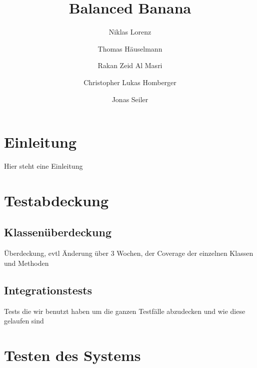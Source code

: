 \documentclass[a4paper,12pt]{article}
\title{Balanced Banana}
\author{Niklas Lorenz \and Thomas Häuselmann \and Rakan Zeid Al Masri \and Christopher Lukas Homberger \and Jonas Seiler}
\begin{document}
\setcounter{page}{2}
\tableofcontents          %
\clearpage
{}

\section{Einleitung}
\vspace{0.2cm}
Hier steht eine Einleitung
\section{Testabdeckung}
\subsection{Klassenüberdeckung}
\vspace{0.2cm}
Überdeckung, evtl Änderung über 3 Wochen, der Coverage der einzelnen Klassen und Methoden
\subsection{Integrationstests}
\vspace{0.2cm}
Tests die wir benutzt haben um die ganzen Testfälle abzudecken und wie diese gelaufen sind
\clearpage
\section{Testen des Systems}
\end{document}
